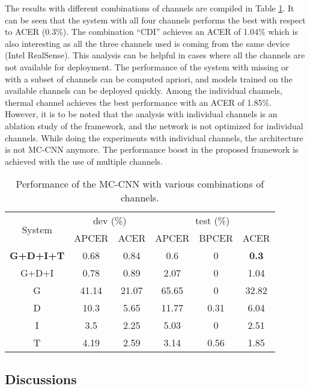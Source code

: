 \documentclass[journal]{IEEEtran}
\begin{document}
The results with different combinations of channels are compiled in Table \ref{tab:ablation_channels}. It can be seen that the system with all four channels performs the best with respect to ACER (0.3\%). The combination ``CDI'' achieves an ACER of 1.04\% which is also interesting as all the three channels used is coming from the same device (Intel RealSense). This analysis can be helpful in cases where all the channels are not available for deployment. The performance of the system with missing or with a subset of channels can be computed apriori, and models trained on the available channels can be deployed quickly. Among the individual channels, thermal channel achieves the best performance with an ACER of 1.85\%. However, it is to be noted that the analysis with individual channels is an ablation study of the framework, and the network is not optimized for individual channels. While doing the experiments with individual channels, the architecture is not MC-CNN anymore. The performance boost in the proposed framework is achieved with the use of multiple channels.

\begin{table}[t]
\centering
\caption{Performance of the MC-CNN with various combinations of channels.}
\label{tab:ablation_channels}
\begin{tabular}{@{}ccc|ccc@{}}
\toprule
\multirow{2}{*}{System} & \multicolumn{2}{c|}{dev (\%)}     & \multicolumn{3}{c}{test (\%)}                                  \\ \cmidrule(l){2-6}
                        & \multicolumn{1}{c|}{APCER} & ACER & \multicolumn{1}{c|}{APCER} & \multicolumn{1}{c|}{BPCER} & ACER  \\ \midrule
\textbf{G+D+I+T} &0.68  &0.84  & 0.6  &   0  &\textbf{0.3} \\
G+D+I  &0.78  &0.89  &2.07  &   0  &1.04\\
G  &41.14 & 21.07&65.65 &  0   &32.82\\
D  &10.3  &5.65  &11.77 & 0.31 & 6.04\\
I  & 3.5  &2.25  &5.03  &   0  &2.51\\
T  &4.19  &2.59  &3.14  &0.56  &1.85\\
\bottomrule
\end{tabular}
\end{table}


\subsection{Discussions}
\end{document}
